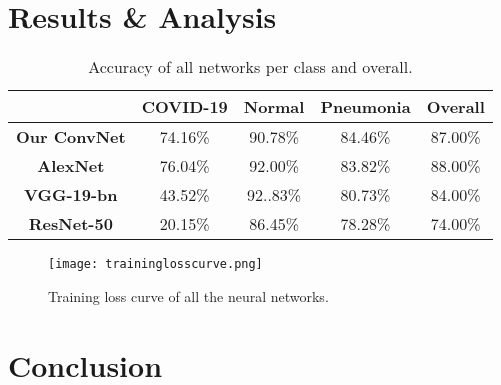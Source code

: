 \documentclass[conference,compsoc]{IEEEtran}
\begin{document}
\section{Results \& Analysis}
\begin{table}[ht]
\caption{Accuracy of all networks per class and overall.}
\begin{tabular}{c|cccc}
                     & \textbf{COVID-19} & \textbf{Normal} & \textbf{Pneumonia} & \textbf{Overall} \\ \hline
\textbf{Our ConvNet} & 74.16\%           & 90.78\%         & 84.46\%            & 87.00\%                   \\
\textbf{AlexNet}     & 76.04\%           & 92.00\%         & 83.82\%            & 88.00\%                   \\
\textbf{VGG-19-bn}   & 43.52\%           & 92..83\%        & 80.73\%            & 84.00\%                   \\
\textbf{ResNet-50}   & 20.15\%           & 86.45\%         & 78.28\%            & 74.00\%                  
\end{tabular}
\end{table}

\begin{figure*}
  \texttt{[image: traininglosscurve.png]}
  \caption{Training loss curve of all the neural networks.}
\end{figure*}


\section{Conclusion}
\end{document}
